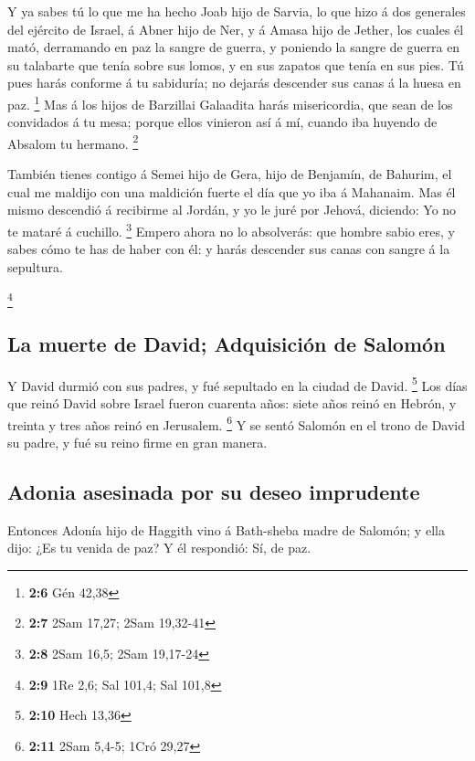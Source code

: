  Y ya sabes tú lo que me ha hecho Joab hijo de Sarvia, lo
que hizo á dos generales del ejército de Israel, á Abner hijo de Ner, y
á Amasa hijo de Jether, los cuales él mató, derramando en paz la sangre
de guerra, y poniendo la sangre de guerra en su talabarte que tenía
sobre sus lomos, y en sus zapatos que tenía en sus pies. 
Tú pues harás conforme á tu sabiduría; no dejarás descender sus canas á
la huesa en paz. \footnote{\textbf{2:6} Gén 42,38}  Mas á
los hijos de Barzillai Galaadita harás misericordia, que sean de los
convidados á tu mesa; porque ellos vinieron así á mí, cuando iba huyendo
de Absalom tu hermano. \footnote{\textbf{2:7} 2Sam 17,27; 2Sam 19,32-41}

 También tienes contigo á Semei hijo de Gera, hijo de
Benjamín, de Bahurim, el cual me maldijo con una maldición fuerte el día
que yo iba á Mahanaim. Mas él mismo descendió á recibirme al Jordán, y
yo le juré por Jehová, diciendo: Yo no te mataré á cuchillo. \footnote{\textbf{2:8}
  2Sam 16,5; 2Sam 19,17-24}  Empero ahora no lo
absolverás: que hombre sabio eres, y sabes cómo te has de haber con él:
y harás descender sus canas con sangre á la sepultura.

\footnote{\textbf{2:9} 1Re 2,6; Sal 101,4; Sal 101,8}

\hypertarget{la-muerte-de-david-adquisiciuxf3n-de-salomuxf3n}{%
\subsection{La muerte de David; Adquisición de
Salomón}\label{la-muerte-de-david-adquisiciuxf3n-de-salomuxf3n}}

 Y David durmió con sus padres, y fué sepultado en la
ciudad de David. \footnote{\textbf{2:10} Hech 13,36}  Los
días que reinó David sobre Israel fueron cuarenta años: siete años reinó
en Hebrón, y treinta y tres años reinó en Jerusalem. \footnote{\textbf{2:11}
  2Sam 5,4-5; 1Cró 29,27}  Y se sentó Salomón en el trono
de David su padre, y fué su reino firme en gran manera.

\hypertarget{adonia-asesinada-por-su-deseo-imprudente}{%
\subsection{Adonia asesinada por su deseo
imprudente}\label{adonia-asesinada-por-su-deseo-imprudente}}

 Entonces Adonía hijo de Haggith vino á Bath-sheba madre
de Salomón; y ella dijo: ¿Es tu venida de paz? Y él respondió: Sí, de
paz.

